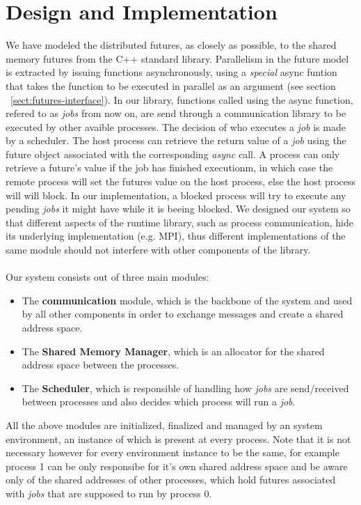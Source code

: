 \chapter{Design and Implementation}

We have modeled the distributed futures, as closely as possible, 
to the shared memory futures from the C++ standard library.  Parallelism in the future
model is extracted by issuing functions asynchronously, using a \emph{special} async funtion
that takes the function to be executed in parallel as an argument (see section ~\ref{sect:futures-interface}).
In our library, functions called using the async function,
refered to as \emph{jobs} from now on, are send through a communication library 
to be executed by other avaible processes.  
The decision of who executes a \emph{job} is made by a scheduler.  The host process can retrieve
the return value of a \emph{job} using the future object associated with the corresponding \emph{async} call.
A process can only retrieve a future's value if the job has finished executionm, in which case the remote 
process will set the futures value on the host process, else the host process will will block.
In our implementation, a blocked process will try to execute any pending \emph{jobs} it might have
while it is beeing blocked.
		We designed our system so that different aspects of the runtime library, such as process
communication, hide its underlying implementation (e.g. MPI),  thus different implementations 
of the same module should not interfere with other components of the library.\\
\\
Our system consists out of three main modules:
\begin{itemize}
	\item The \textbf{communication} module, which is the backbone of the system
	and used by all other components in order to exchange messages and create a shared address space.

	\item The \textbf{Shared Memory Manager}, which is an allocator for the shared address space between the processes.

	\item The \textbf{Scheduler}, which is responsible of handling how \emph{jobs} are send/received between processes
	and also decides which process will run a \emph{job}.
\end{itemize}

\vfill

All the above modules are initialized, finalized and managed by an system environment, 
an instance of which is present
at every process.  Note that it is not necessary however for every environment instance to be the same, for
example process 1 can be only responsibe for it's own shared address space and be aware only of the shared
addresses of other processes, which hold futures associated with \emph{jobs} that are supposed to run by
process 0.

